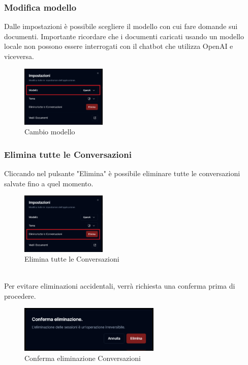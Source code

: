 \subsubsection{Modifica modello}
Dalle impostazioni è possibile scegliere il modello con cui fare domande sui documenti. Importante ricordare che i documenti caricati usando un modello locale non possono
essere interrogati con il chatbot che utilizza OpenAI e viceversa.
\begin{figure}[h!]
    \centering
    \includegraphics[width=0.364\textwidth]{settingchatmodel.png}
    \caption{Cambio modello}\label{fig:settingchatmodel}
\end{figure}

\newpage
\subsubsection{Elimina tutte le Conversazioni}
Cliccando nel pulsante "Elimina" è possibile eliminare tutte le conversazioni salvate fino a quel momento.
\begin{figure}[h!]
    \centering
    \includegraphics[width=0.364\textwidth]{deleteallchat.png}
    \caption{Elimina tutte le Conversazioni}\label{fig:deleteallchat}
\end{figure}
\\Per evitare eliminazioni accidentali, verrà richiesta una conferma prima di procedere.
\begin{figure}[h!]
    \centering
    \includegraphics[width=0.6\textwidth]{confirmdeleteconversations.png}
    \caption{Conferma eliminazione Conversazioni}\label{fig:dialogdeleteconversation}
\end{figure}

